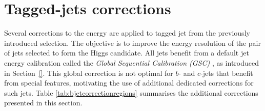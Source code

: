 \clearpage

\section{Tagged-jets corrections}\label{sec-vh-jetcor}
Several corrections to the energy are applied to tagged jet from the previously introduced selection. The objective is to improve the energy resolution of the pair of jets selected to form the Higgs candidate. All jets benefit from a default jet energy calibration called the \textit{Global Sequential Calibration (GSC)} \cite{PhysRevD.96.072002}, as introduced in Section~\ref{}. This global correction is not optimal for $b$- and $c$-jets that benefit from special features, motivating the use of additional dedicated corrections for such jets. Table \ref{tab:bjetcorrectionregions} summarises the additional corrections presented in this section. %

\begin{table}[!htbp]
  \begin{center}
  \caption{The different $H$-candidate jet energy correction.} 
  \label{tab:bjetcorrectionregions}
  \end{center}
\end{table}
  
